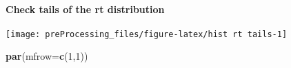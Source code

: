 \documentclass[
]{article}
\newenvironment{Shaded}{\begin{snugshade}}{\end{snugshade}}
\newcommand{\DataTypeTok}[1]{\textcolor[rgb]{0.13,0.29,0.53}{#1}}
\newcommand{\DecValTok}[1]{\textcolor[rgb]{0.00,0.00,0.81}{#1}}
\newcommand{\KeywordTok}[1]{\textcolor[rgb]{0.13,0.29,0.53}{\textbf{#1}}}
\newcommand{\NormalTok}[1]{#1}
\newcommand{\OperatorTok}[1]{\textcolor[rgb]{0.81,0.36,0.00}{\textbf{#1}}}
\newcommand{\StringTok}[1]{\textcolor[rgb]{0.31,0.60,0.02}{#1}}
\begin{document}
\hypertarget{check-tails-of-the-rt-distribution-1}{%
\paragraph{Check tails of the rt
distribution}\label{check-tails-of-the-rt-distribution-1}}

\begin{Shaded}
\end{Shaded}

\begin{center}\texttt{[image: preProcessing\_files/figure-latex/hist rt tails-1]} \end{center}

\begin{Shaded}
\begin{Highlighting}[]
\KeywordTok{par}\NormalTok{(}\DataTypeTok{mfrow=}\KeywordTok{c}\NormalTok{(}\DecValTok{1}\NormalTok{,}\DecValTok{1}\NormalTok{))}
\end{Highlighting}
\end{Shaded}
\end{document}
